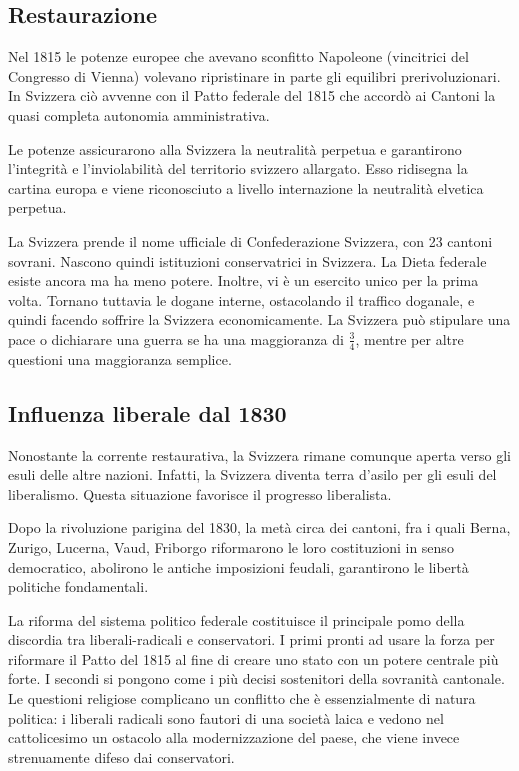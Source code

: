 \documentclass[a4paper]{article}
\begin{document}
\subsection{Restaurazione}

Nel 1815 le potenze europee che avevano sconfitto Napoleone (vincitrici del Congresso di Vienna)
volevano ripristinare in parte gli equilibri prerivoluzionari.
In Svizzera ciò avvenne con il Patto federale del 1815 che
accordò ai Cantoni la quasi completa autonomia amministrativa.


Le potenze assicurarono alla Svizzera la neutralità perpetua e garantirono
l'integrità e l'inviolabilità del territorio svizzero allargato.
Esso ridisegna la cartina europa e viene riconosciuto a livello internazione la neutralità elvetica perpetua.

La Svizzera prende il nome ufficiale di Confederazione Svizzera, con 23 cantoni sovrani.
Nascono quindi istituzioni conservatrici in Svizzera.
La Dieta federale esiste ancora ma ha meno potere.
Inoltre, vi è un esercito unico per la prima volta.
Tornano tuttavia le dogane interne, ostacolando il traffico doganale, e quindi facendo
soffrire la Svizzera economicamente.
La Svizzera può stipulare una pace o dichiarare una guerra se ha una maggioranza di \(\frac{3}{4}\),
mentre per altre questioni una maggioranza semplice.

\subsection{Influenza liberale dal 1830}

Nonostante la corrente restaurativa, la Svizzera rimane
comunque aperta verso gli esuli delle altre nazioni.
Infatti, la Svizzera diventa terra d'asilo per gli esuli del liberalismo.
Questa situazione favorisce il progresso liberalista.

Dopo la rivoluzione parigina del 1830, la metà circa dei cantoni, fra i quali Berna, Zurigo,
Lucerna, Vaud, Friborgo riformarono le loro costituzioni in senso democratico,
abolirono le antiche imposizioni feudali, garantirono le libertà politiche fondamentali.

La riforma del sistema politico federale costituisce il principale pomo della discordia
tra liberali-radicali e conservatori. I primi pronti ad usare la forza per riformare il Patto
del 1815 al fine di creare uno stato con un potere centrale più forte. I secondi si
pongono come i più decisi sostenitori della sovranità cantonale. Le questioni religiose
complicano un conflitto che è essenzialmente di natura politica: i liberali radicali sono
fautori di una società laica e vedono nel cattolicesimo un ostacolo alla modernizzazione
del paese, che viene invece strenuamente difeso dai conservatori.
\end{document}
